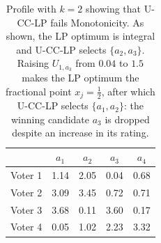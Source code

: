 \documentclass[letterpaper]{article} %
\newcommand{\LP}{\textsc{U-CC-LP}}
\begin{document}
\begin{table}[t]
\centering
\begin{tabular}{l|cccc}
\hline
 & $a_1$ & $a_2$ & $a_3$ & $a_4$ \\
\hline
Voter 1 & 1.14 & 2.05 & 0.04 & 0.68 \\
Voter 2 & 3.09 & 3.45 & 0.72 & 0.71 \\
Voter 3 & 3.68 & 0.11 & 3.60 & 0.17 \\
Voter 4 & 0.05 & 1.02 & 2.23 & 3.32 \\
\hline
\end{tabular}
\caption{Profile with $k=2$ showing that \LP{} fails Monotonicity.
As shown, the LP optimum is integral and \LP{} selects $\{a_2,a_3\}$.
Raising $U_{1,a_3}$ from $0.04$ to $1.5$ makes the LP optimum the fractional point $x_j=\tfrac12$, after which \LP{} selects $\{a_1,a_2\}$: the winning candidate $a_3$ is dropped despite an increase in its rating.}
\label{tab:lp-monotonicity}
\end{table}




\end{document}
